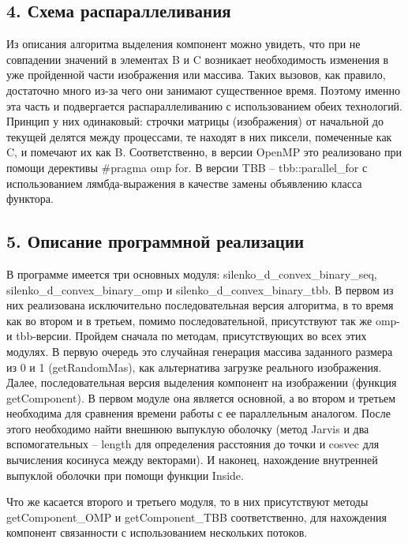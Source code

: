 \documentclass{report}
\begin{document}
\newpage


\begin{center}
\section*{4. Схема распараллеливания}
\end{center}
\par Из описания алгоритма выделения компонент можно увидеть, что при не совпадении значений в элементах B и C возникает необходимость изменения в уже пройденной части изображения или массива. Таких вызовов, как правило, достаточно много из-за чего они занимают существенное время. Поэтому именно эта часть и подвергается распараллеливанию с использованием обеих технологий. Принцип у них одинаковый: строчки матрицы (изображения) от начальной до текущей делятся между процессами, те находят в них пиксели, помеченные как C, и помечают их как B. Соответственно, в версии OpenMP это реализовано при помощи дерективы \#pragma omp for. В версии TBB – tbb::parallel\_for с использованием лямбда-выражения в качестве замены объявлению класса функтора.

\newpage


\begin{center}
\section*{5. Описание программной реализации}
\end{center}
\par В программе имеется три основных модуля: silenko\_d\_convex\_binary\_seq, silenko\_d\_convex\_binary\_omp и silenko\_d\_convex\_binary\_tbb. В первом из них реализована исключительно последовательная версия алгоритма, в то время как во втором и в третьем, помимо последовательной, присутствуют так же omp- и tbb-версии. Пройдем сначала по методам, присутствующих во всех этих модулях. В первую очередь это случайная генерация массива заданного размера из 0 и 1 (getRandomMas), как альтернатива загрузке реального изображения. Далее, последовательная версия выделения компонент на изображении (функция getComponent). В первом модуле она является основной, а во втором и третьем необходима для сравнения времени работы с ее параллельным аналогом. После этого необходимо найти внешнюю выпуклую оболочку (метод Jarvis и два вспомогательных – length для определения расстояния до точки и cosvec для вычисления косинуса между векторами). И наконец, нахождение внутренней выпуклой оболочки при помощи функции Inside.
\par Что же касается второго и третьего модуля, то в них  присутствуют методы getComponent\_OMP и getComponent\_TBB соответственно, для нахождения компонент связанности с использованием нескольких потоков.
\end{document}

